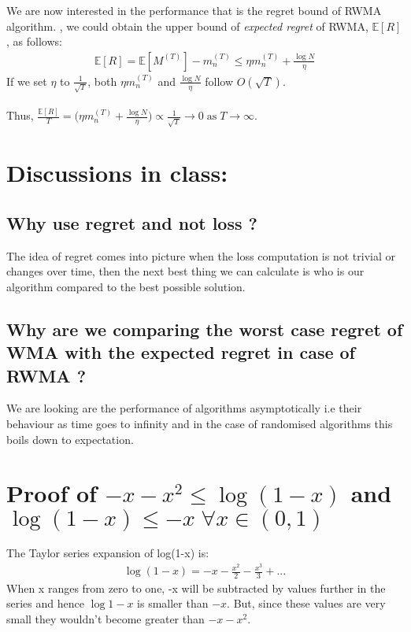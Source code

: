 \documentclass[11pt]{article}
\begin{document}
We are now interested in the performance that is the regret bound of RWMA algorithm.
, we could obtain the upper bound of \textit{expected regret} of RWMA, $\mathbb{E}[R]$, as follows:
\begin{align}
    \mathbb{E}[R] = \mathbb{E}[M^{(T)}] - m_n^{(T)} \leq \eta m_n^{(T)} + \frac{\log N}{\eta} \label{eq:rwma_final}
\end{align}
If we set $\eta$ to $\frac{1}{\sqrt{T}}$, both $\eta m_n^{(T)}$ and $\frac{\log N}{\eta}$ follow $O(\sqrt{T})$.\\\\
Thus, $\frac{\mathbb{E}[R]}{T} = \Big(\eta m_n^{(T)} + \frac{\log N}{\eta}\Big) \propto \frac{1}{\sqrt{T}}\rightarrow 0\;\text{as}\;T\rightarrow\infty$.

\section{Discussions in class:}
\subsection{Why use regret and not loss ?}
The idea of regret comes into picture when the loss computation is not trivial or changes over time, then the next best thing we can calculate is who is our algorithm compared to the best possible solution.
\subsection{Why are we comparing the worst case regret of WMA with the expected regret in case of RWMA ?}
We are looking are the performance of algorithms asymptotically i.e their behaviour as time goes to infinity and in the case of randomised algorithms this boils down to expectation.


{


}




\appendix

\section{Proof of $-x-x^2\leq\log(1-x)\label{appendix:ineq2}$ and
    $\log(1-x)\leq-x \;\forall x \in (0,1)\label{appendix:ineq1}$}
The Taylor series expansion of log(1-x) is:
\begin{align}
    \log(1-x)=-x-\frac{x^2}{2}-\frac{x^3}{3}+...
\end{align}
When x ranges from zero to one, -x will be subtracted by values further in the series and hence $\log{1-x}$ is smaller than $-x.$ But, since these values are very small they wouldn't become greater than $-x-x^{2}$.  
\end{document}
